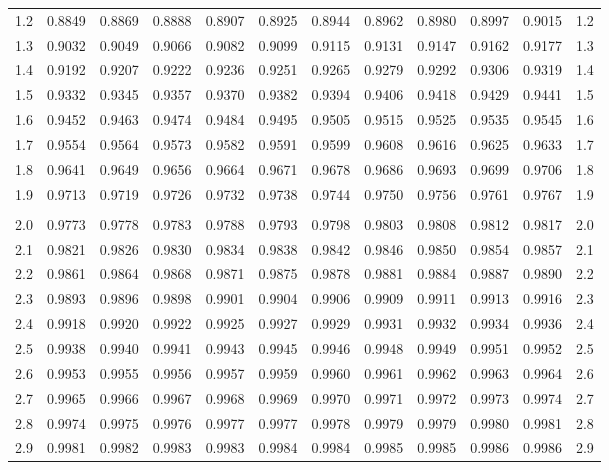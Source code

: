 \documentclass[12pt]{article}
\begin{document}
\begin{landscape}
\begin{adjustbox}{angle=270}
\begin{tabular}{r@{\hspace{4.5mm}}
	*5{c @{\hspace{2.5mm}}}@{\hspace{-0.5mm}}*5{@{\hspace{2.5mm}}c}@{\hspace{2mm}}r}
1.2 & 0.8849 & 0.8869 & 0.8888 & 0.8907 & 0.8925 & 0.8944 & 0.8962 & 0.8980 & 0.8997 & 0.9015 & 1.2 \\
1.3 & 0.9032 & 0.9049 & 0.9066 & 0.9082 & 0.9099 & 0.9115 & 0.9131 & 0.9147 & 0.9162 & 0.9177 & 1.3 \\
1.4 & 0.9192 & 0.9207 & 0.9222 & 0.9236 & 0.9251 & 0.9265 & 0.9279 & 0.9292 & 0.9306 & 0.9319 & 1.4 \\
1.5 & 0.9332 & 0.9345 & 0.9357 & 0.9370 & 0.9382 & 0.9394 & 0.9406 & 0.9418 & 0.9429 & 0.9441 & 1.5 \\
1.6 & 0.9452 & 0.9463 & 0.9474 & 0.9484 & 0.9495 & 0.9505 & 0.9515 & 0.9525 & 0.9535 & 0.9545 & 1.6 \\
1.7 & 0.9554 & 0.9564 & 0.9573 & 0.9582 & 0.9591 & 0.9599 & 0.9608 & 0.9616 & 0.9625 & 0.9633 & 1.7 \\
1.8 & 0.9641 & 0.9649 & 0.9656 & 0.9664 & 0.9671 & 0.9678 & 0.9686 & 0.9693 & 0.9699 & 0.9706 & 1.8 \\
1.9 & 0.9713 & 0.9719 & 0.9726 & 0.9732 & 0.9738 & 0.9744 & 0.9750 & 0.9756 & 0.9761 & 0.9767 & 1.9 \\
&&&&&&&&&&{} \\
2.0 & 0.9773 & 0.9778 & 0.9783 & 0.9788 & 0.9793 & 0.9798 & 0.9803 & 0.9808 & 0.9812 & 0.9817 & 2.0 \\
2.1 & 0.9821 & 0.9826 & 0.9830 & 0.9834 & 0.9838 & 0.9842 & 0.9846 & 0.9850 & 0.9854 & 0.9857 & 2.1 \\
2.2 & 0.9861 & 0.9864 & 0.9868 & 0.9871 & 0.9875 & 0.9878 & 0.9881 & 0.9884 & 0.9887 & 0.9890 & 2.2 \\
2.3 & 0.9893 & 0.9896 & 0.9898 & 0.9901 & 0.9904 & 0.9906 & 0.9909 & 0.9911 & 0.9913 & 0.9916 & 2.3 \\
2.4 & 0.9918 & 0.9920 & 0.9922 & 0.9925 & 0.9927 & 0.9929 & 0.9931 & 0.9932 & 0.9934 & 0.9936 & 2.4 \\
2.5 & 0.9938 & 0.9940 & 0.9941 & 0.9943 & 0.9945 & 0.9946 & 0.9948 & 0.9949 & 0.9951 & 0.9952 & 2.5 \\
2.6 & 0.9953 & 0.9955 & 0.9956 & 0.9957 & 0.9959 & 0.9960 & 0.9961 & 0.9962 & 0.9963 & 0.9964 & 2.6 \\
2.7 & 0.9965 & 0.9966 & 0.9967 & 0.9968 & 0.9969 & 0.9970 & 0.9971 & 0.9972 & 0.9973 & 0.9974 & 2.7 \\
2.8 & 0.9974 & 0.9975 & 0.9976 & 0.9977 & 0.9977 & 0.9978 & 0.9979 & 0.9979 & 0.9980 & 0.9981 & 2.8 \\
2.9 & 0.9981 & 0.9982 & 0.9983 & 0.9983 & 0.9984 & 0.9984 & 0.9985 & 0.9985 & 0.9986 & 0.9986 & 2.9 \\

\end{tabular}
\end{adjustbox}
\end{landscape}
\end{document}
